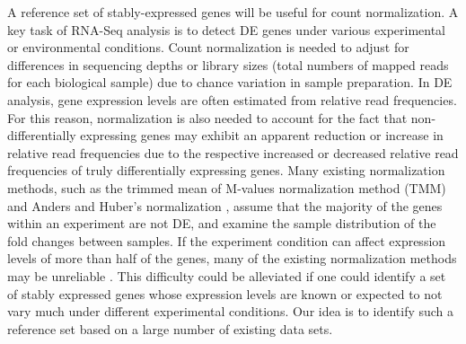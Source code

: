 \documentclass[fleqn,10pt,lineno]{wlpeerj} %
\begin{document}
A reference set of stably-expressed genes will be useful for count
normalization.  A key task of RNA-Seq analysis is to detect DE genes under
various experimental or environmental conditions. Count normalization is
needed to adjust for differences in sequencing depths or library sizes (total
numbers of mapped reads for each biological sample) due to chance variation in
sample preparation.  In DE analysis, gene expression levels are often
estimated from relative read frequencies. For this reason, normalization is also 
needed to account for the fact that non-differentially expressing genes may exhibit
an apparent reduction or increase in relative read frequencies due to the respective 
increased or decreased relative read frequencies of truly differentially expressing genes.
Many existing normalization methods, such as the trimmed
mean of M-values normalization method (TMM) \citep{robinson2010scaling} and
Anders and Huber's normalization \citep{anders2010differential}, assume that the
majority of the genes within an experiment are not DE, and examine the sample
distribution of the fold changes between samples.
If the experiment condition can affect expression levels of more than half of
the genes, many of the existing normalization methods may be unreliable
\citep{loven2012revisiting, wu2013use}.  This difficulty could be
alleviated if one could identify a set of stably expressed genes whose
expression levels are known or expected to not vary much under different
experimental conditions. Our idea is to identify such a reference set based on
a large number of existing data sets.
\end{document}
